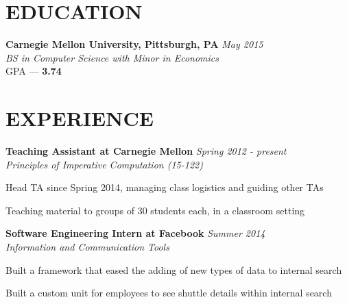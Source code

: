 \documentclass[margin, 11pt]{res} %
\begin{document}
\begin{resume}


\section{EDUCATION}

{\bf Carnegie Mellon University, Pittsburgh, PA} \hfill {\sl May 2015}\\
{\sl BS in Computer Science with Minor in Economics } \\
{\small GPA --- \textbf{3.74}}



\section{EXPERIENCE}

{\bf Teaching Assistant at Carnegie Mellon} \hfill {\sl Spring 2012 - present}\\
{\sl Principles of Imperative Computation (15-122)}

\begin{itemize} \itemsep -2pt
{\small \item Head TA since Spring 2014, managing class logistics and guiding other TAs
\item Teaching material to groups of 30 students each, in a classroom setting}
\end{itemize}

\vspace{3pt}

{\bf Software Engineering Intern at Facebook} \hfill {\sl Summer 2014}\\
{\sl Information and Communication Tools}

\begin{itemize} \itemsep -2pt
{\small
\item Built a framework that eased the adding of new types of data to internal search
\item Built a custom unit for employees to see shuttle details within internal search
}
\end{itemize}


\end{resume}
\end{document}
